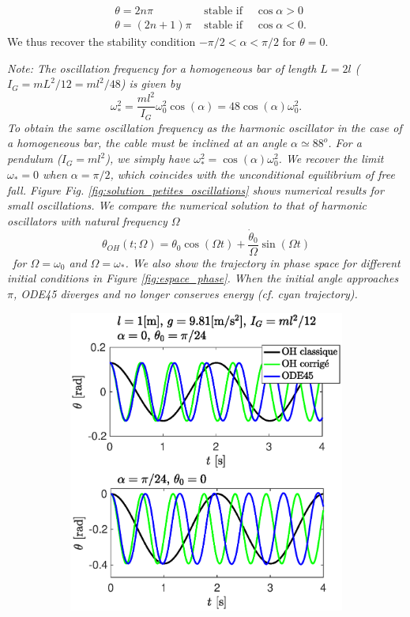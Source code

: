 \documentclass[11pt,a4paper]{exam}
\newcommand{\noteACDH}[1]{\textit{Note: #1}}
\begin{document}
\begin{parts}
\begin{align}
        &\theta = 2n\pi   &\textrm{ stable if }& \cos\alpha > 0 \nonumber\\
        &\theta = (2n+1)\pi &\textrm{ stable if }& \cos\alpha < 0 \nonumber.
    \end{align}
    We thus recover the stability condition $-\pi/2<\alpha<\pi/2$ for $\theta=0$.
    \par
    \noteACDH{The oscillation frequency for a homogeneous bar of length $L=2l$ ($I_G=mL^2/12=ml^2/48$) is given by 
    $$\omega_*^2 = \frac{ml^2}{I_G} \omega_0^2\cos(\alpha) = 48\cos(\alpha) \omega_0^2. $$
    To obtain the same oscillation frequency as the harmonic oscillator in the case of a homogeneous bar, the cable must be inclined at an angle $\alpha\simeq 88^o$.
    For a pendulum ($I_G = ml^2$), we simply have $\omega_*^2=\cos(\alpha)\omega_0^2$.
    We recover the limit $\omega_*=0$ when $\alpha=\pi/2$, which coincides with the unconditional equilibrium of free fall.
     Figure Fig. \ref{fig:solution_petites_oscillations} shows numerical results for small oscillations.
    We compare the numerical solution to that of harmonic oscillators with natural frequency $\Omega$
    \begin{equation}
        \theta_{OH}(t;\Omega) =\theta_0\cos(\Omega t)+\frac{\dot\theta_0}{\Omega} \sin(\Omega t)
    \end{equation}\
    for $\Omega=\omega_0$ and $\Omega=\omega_*$.
    We also show the trajectory in phase space for different initial conditions in Figure \ref{fig:espace_phase}.
    When the initial angle approaches $\pi$, ODE45 diverges and no longer conserves energy (cf. cyan trajectory).}
    \begin{figure}
    \centering
    \begin{subfigure}{.45\textwidth}
      \centering
        \includegraphics[width=0.95\linewidth]{ExoFig/tyr_solution_petites_oscillations.eps}

\end{subfigure}
\end{figure}
\end{parts}
\end{document}
